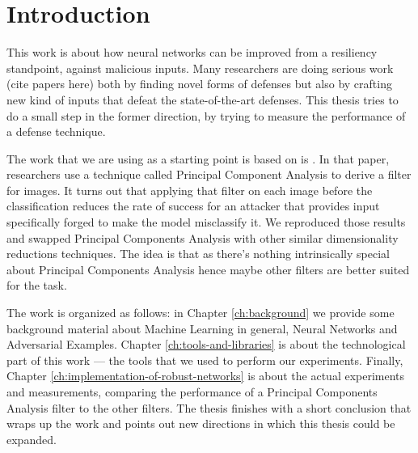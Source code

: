 \chapter*{Introduction}

This work is about how neural networks can be improved from a
resiliency standpoint, against malicious inputs. Many researchers are
doing serious work (cite papers here) both by finding novel forms of
defenses but also by crafting new kind of inputs that defeat the
state-of-the-art defenses. This thesis tries to do a small step in the
former direction, by trying to measure the performance of a defense
technique.

The work that we are using as a starting point is based on is
\cite{bhagoji2018enhancing}. In that paper, researchers use a technique
called Principal Component Analysis to derive a filter for images. It
turns out that applying that filter on each image before the
classification reduces the rate of success for an attacker that
provides input specifically forged to make the model misclassify it. We
reproduced those results and swapped Principal Components Analysis with
other similar dimensionality reductions techniques. The idea is that as
there's nothing intrinsically special about Principal Components
Analysis hence maybe other filters are better suited for the task.

The work is organized as follows: in Chapter \ref{ch:background} we
provide some background material about Machine Learning in general,
Neural Networks and Adversarial Examples. Chapter
\ref{ch:tools-and-libraries} is about the technological part of this
work --- the tools that we used to perform our experiments. Finally,
Chapter \ref{ch:implementation-of-robust-networks} is about the actual
experiments and measurements, comparing the performance of a Principal
Components Analysis filter to the other filters. The thesis finishes
with a short conclusion that wraps up the work and points out new
directions in which this thesis could be expanded.

